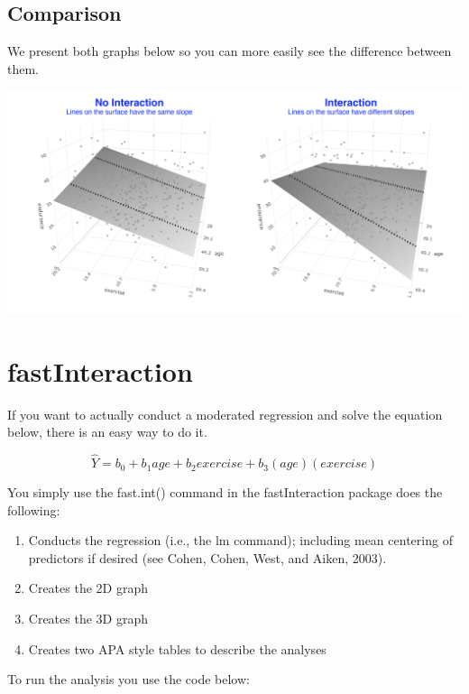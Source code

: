 \documentclass[
]{krantz}
\begin{document}
\hypertarget{comparison}{%
\subsection{Comparison}\label{comparison}}

We present both graphs below so you can more easily see the difference between them.

\includegraphics[width=0.9\linewidth]{ch_mmr/images/mmr_both}

\hypertarget{fastinteraction}{%
\section{fastInteraction}\label{fastinteraction}}

If you want to actually conduct a moderated regression and solve the equation below, there is an easy way to do it.

\[ \hat{Y} = b_0 + b_1age + b_2exercise + b_3(age)(exercise)\]

You simply use the fast.int() command in the fastInteraction package does the following:

\begin{enumerate}
\def\labelenumi{\arabic{enumi}.}
\item
  Conducts the regression (i.e., the lm command); including mean centering of predictors if desired (see Cohen, Cohen, West, and Aiken, 2003).
\item
  Creates the 2D graph
\item
  Creates the 3D graph
\item
  Creates two APA style tables to describe the analyses
\end{enumerate}

To run the analysis you use the code below:
\end{document}
